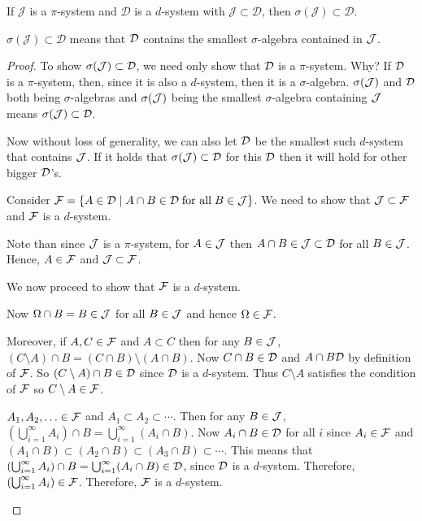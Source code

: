 \begin{theorem}\label{thm:3}
If $\mathcal J$ is a $\pi$-system and $\mathcal D$ is a $d$-system with $\mathcal J\subset \mathcal D$, then $\sigma(\mathcal J)\subset \mathcal D$.
\end{theorem}

\begin{notes}
$\sigma(\mathcal J)\subset \mathcal D$ means that $\mathcal D$ contains the smallest $\sigma$-algebra contained in $\mathcal J$. 
\end{notes}

\begin{proof}
To show $\sigma(\mathcal J)\subset \mathcal D$, we need only show that $\mathcal D$ is a $\pi$-system. Why? If $\mathcal D$ is a $\pi$-system, then, since it is also a $d$-system, then it is a $\sigma$-algebra. $\sigma(\mathcal J)$ and $\mathcal D$ both being $\sigma$-algebras and $\sigma(\mathcal J)$ being the smallest $\sigma$-algebra containing $\mathcal J$ means $\sigma(\mathcal J)\subset \mathcal D$.

Now without loss of generality, we can also let $\mathcal D$ be the smallest such $d$-system that contains $\mathcal J$. If it holds that $\sigma(\mathcal J)\subset \mathcal D$ for this $\mathcal D$ then it will hold for other bigger $\mathcal D$'s.

Consider $\mathcal F=\{A\in\mathcal D\mid A\cap B\in\mathcal D\; \text{for all}\; B\in\mathcal J \}$. We need to show that $\mathcal J\subset \mathcal F$ and $\mathcal F$ is a $d$-system.

Note than since $\mathcal J$ is a $\pi$-system, for $A\in\mathcal J$ then $A\cap B\in\mathcal J\subset \mathcal D$ for all $B\in\mathcal J$. Hence, $A\in\mathcal F$ and $\mathcal J\subset\mathcal F$.

We now proceed to show that $\mathcal F$ is a $d$-system. 
\begin{prooflist}
	\item Now $\Omega\cap B=B\in\mathcal J$ for all $B\in\mathcal J$ and hence $\Omega\in\mathcal F$.
	\item Moreover, if $A,C\in\mathcal F$ and $A\subset C$ then for any $B\in \mathcal J$, $(C\setminus A)\cap B=(C\cap B)\setminus (A\cap B)$. Now $C\cap B\in \mathcal D$ and $A\cap B \mathcal D$ by definition of $\mathcal F$. So $(C\setminus A)\cap B\in \mathcal D$ since $\mathcal D$ is a $d$-system. Thus $C\setminus A$ satisfies the condition of $\mathcal F$ so $C\setminus A\in \mathcal F$.
	\item $A_1, A_2, \ldots \in\mathcal F$ and $A_1\subset A_2\subset\cdots$. Then for any $B\in\mathcal J$, $\left(\bigcup_{i=1}^\infty A_i\right)\cap B = \bigcup_{i=1}^\infty(A_i\cap B)$. Now $A_i\cap B\in\mathcal D$ for all $i$ since $A_i\in\mathcal F$ and $(A_1\cap B)\subset (A_2\cap B)\subset (A_3\cap B)\subset \cdots$. This means that $\left(\bigcup_{i=1}^\infty A_i\right)\cap B=\bigcup_{i=1}^\infty(A_i\cap B)\in\mathcal D$, since $\mathcal D$ is a $d$-system. Therefore, $\left(\bigcup_{i=1}^\infty A_i\right)\in\mathcal F$. Therefore, $\mathcal F$ is a $d$-system.
\end{prooflist}



\end{proof}
